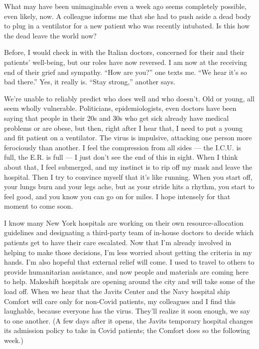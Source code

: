 What may have been unimaginable even a week ago seems completely
possible, even likely, now. A colleague informs me that she had to push
aside a dead body to plug in a ventilator for a new patient who was
recently intubated. Is this how the dead leave the world now?

Before, I would check in with the Italian doctors, concerned for their
and their patients' well-being, but our roles have now reversed. I am
now at the receiving end of their grief and sympathy. ``How are you?''
one texts me. ``We hear it's so bad there.'' Yes, it really is. ``Stay
strong,'' another says.

We're unable to reliably predict who does well and who doesn't. Old or
young, all seem wholly vulnerable. Politicians, epidemiologists, even
doctors have been saying that people in their 20s and 30s who get sick
already have medical problems or are obese, but then, right after I hear
that, I need to put a young and fit patient on a ventilator. The virus
is impulsive, attacking one person more ferociously than another. I feel
the compression from all sides --- the I.C.U. is full, the E.R. is full
--- I just don't see the end of this in sight. When I think about that,
I feel submerged, and my instinct is to rip off my mask and leave the
hospital. Then I try to convince myself that it's like running. When you
start off, your lungs burn and your legs ache, but as your stride hits a
rhythm, you start to feel good, and you know you can go on for miles. I
hope intensely for that moment to come soon.

I know many New York hospitals are working on their own
resource-allocation guidelines and designating a third-party team of
in-house doctors to decide which patients get to have their care
escalated. Now that I'm already involved in helping to make those
decisions, I'm less worried about getting the criteria in my hands. I'm
also hopeful that external relief will come. I used to travel to others
to provide humanitarian assistance, and now people and materials are
coming here to help. Makeshift hospitals are opening around the city and
will take some of the load off. When we hear that the Javits Center and
the Navy hospital ship Comfort will care only for non-Covid patients, my
colleagues and I find this laughable, because everyone has the virus.
They'll realize it soon enough, we say to one another. (A few days after
it opens, the Javits temporary hospital changes its admission policy to
take in Covid patients; the Comfort does so the following week.)

